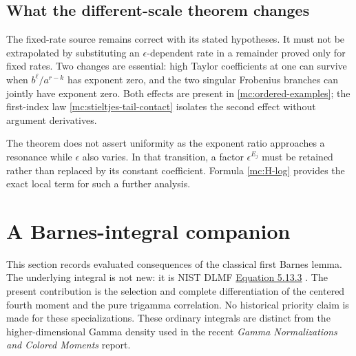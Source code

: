 \documentclass[11pt,a4paper]{article}
\numberwithin{equation}{section}
\theoremstyle{definition}
\theoremstyle{remark}
\begin{document}
\subsection{What the different-scale theorem changes}

The fixed-rate source remains correct with its stated hypotheses.
It must not be extrapolated by substituting an
$\epsilon$-dependent rate in a remainder proved only for fixed rates.
Two changes are essential: high Taylor coefficients at one can
survive when $b^\ell/a^{r-k}$ has exponent zero, and the two
singular Frobenius branches can jointly have exponent zero.
Both effects are present in \eqref{mc:ordered-examples}; the
first-index law \eqref{mc:stieltjes-tail-contact} isolates the
second effect without argument derivatives.

The theorem does not assert uniformity as the exponent ratio
approaches a resonance while $\epsilon$ also varies. In that
transition, a factor $\epsilon^{E_j}$ must be retained rather than
replaced by its constant coefficient. Formula \eqref{mc:H-log}
provides the exact local term for such a further analysis.



\section{A Barnes-integral companion}
\label{bim:section}

This section records evaluated consequences of the classical first Barnes
lemma.  The underlying integral is not new: it is NIST DLMF
\href{https://dlmf.nist.gov/5.13.E3}{Equation 5.13.3} \cite{DLMF}.  The present
contribution is the selection and complete differentiation of the
centered fourth moment and the pure trigamma correlation.  No historical priority claim is made for these specializations.  These ordinary integrals are
distinct from the higher-dimensional Gamma density used in the recent
\emph{Gamma Normalizations and Colored Moments} report.
\end{document}
